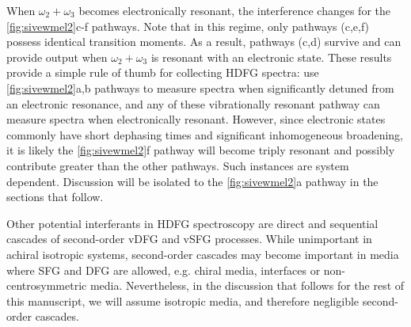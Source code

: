 \documentclass[aip, jcp, reprint, onecolumn, nofootinbib]{revtex4-2}
\begin{document}
When $\omega_2 + \omega_3$ becomes electronically resonant, the interference changes for the \autoref{fig:sivewmel2}c-f pathways.
Note that in this regime, only pathways (c,e,f) possess identical transition moments.
As a result, pathways (c,d) survive and can provide output when $\omega_2+\omega_3$ is resonant with an electronic state. 
These results provide a simple rule of thumb for collecting HDFG spectra: use \autoref{fig:sivewmel2}a,b pathways to measure spectra when significantly detuned from an electronic resonance, and any of these vibrationally resonant pathway can measure spectra when electronically resonant.
However, since electronic states commonly have short dephasing times and significant inhomogeneous broadening,\cite{Dong2015, Lewis2015} it is likely the \autoref{fig:sivewmel2}f pathway will become triply resonant and possibly contribute greater than the other pathways. 
Such instances are system dependent. 
Discussion will be isolated to the \autoref{fig:sivewmel2}a pathway in the sections that follow.

Other potential interferants in HDFG spectroscopy are direct and sequential cascades of second-order vDFG and vSFG processes.\cite{RN297, Cho2000_Cascade, RN301}
While unimportant in achiral isotropic systems,\cite{Belkin2000} second-order cascades may become important in media where SFG and DFG are allowed, e.g. chiral media, interfaces or non-centrosymmetric media. 
Nevertheless, in the discussion that follows for the rest of this manuscript, we will assume isotropic media, and therefore negligible second-order cascades. 
\end{document}
